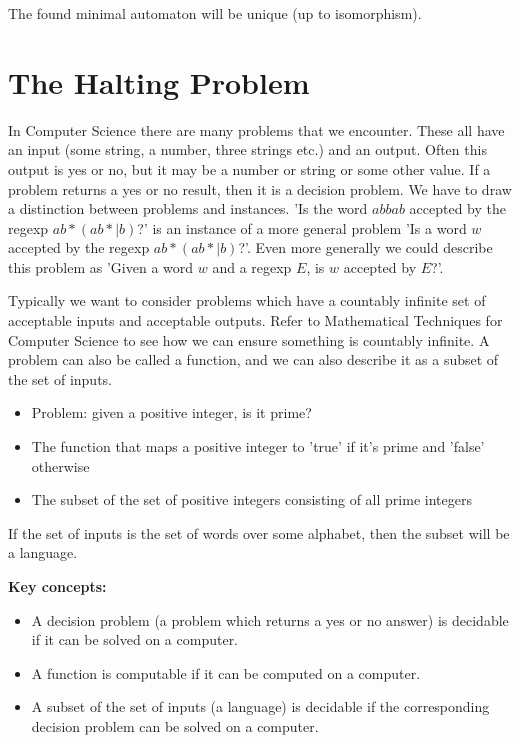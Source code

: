 \documentclass[11pt]{article}
\begin{document}
	The found minimal automaton will be unique (up to isomorphism).
		
		
	\section{The Halting Problem}
	In Computer Science there are many problems that we encounter. These all have an input (some string, a number, three strings etc.) and an output. Often this output is yes or no, but it may be a number or string or some other value. If a problem returns a yes or no result, then it is a decision problem. We have to draw a distinction between problems and instances. 'Is the word $abbab$ accepted by the regexp $ab*(ab*|b)$?' is an instance of a more general problem 'Is a word $w$ accepted by the regexp $ab*(ab*|b)$?'. Even more generally we could describe this problem as 'Given a word $w$ and a regexp $E$, is $w$ accepted by $E$?'.
	
	\par 
	Typically we want to consider problems which have a countably infinite set of acceptable inputs and acceptable outputs. Refer to Mathematical Techniques for Computer Science to see how we can ensure something is countably infinite. A problem can also be called a function, and we can also describe it as a subset of the set of inputs. 
	\begin{itemize}
		\item Problem: given a positive integer, is it prime?
		\item The function that maps a positive integer to 'true' if it's prime and 'false' otherwise
		\item The subset of the set of positive integers consisting of all prime integers
	\end{itemize}
	If the set of inputs is the set of words over some alphabet, then the subset will be a language.
	
	\par
	\textbf{Key concepts:}
	\begin{itemize}
		\item A decision problem (a problem which returns a yes or no answer) is decidable if it can be solved on a computer.
		\item A function is computable if it can be computed on a computer.
		\item A subset of the set of inputs (a language) is decidable if the corresponding decision problem can be solved on a computer.
	\end{itemize}
	
\end{document}
